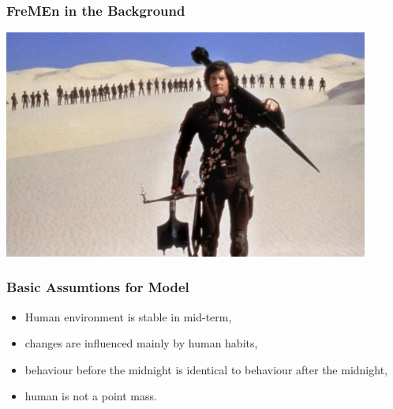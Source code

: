 
\begin{frame}
	\frametitle{FreMEn in the Background}
    \vspace{3mm}
    \href{run:./video/pitch.mkv}{\includegraphics[width=0.9\textwidth]{fig/fremen_backgroung.jpeg}}
\end{frame}



\begin{frame}
	\frametitle{Basic Assumtions for Model}
    \vspace{3mm}
    \begin{itemize}
        \item Human environment is stable in mid-term,
        \item changes are influenced mainly by human habits,
        \item behaviour before the midnight is identical to behaviour after the midnight,
        \item human is not a point mass.
    \end{itemize}
\end{frame}



